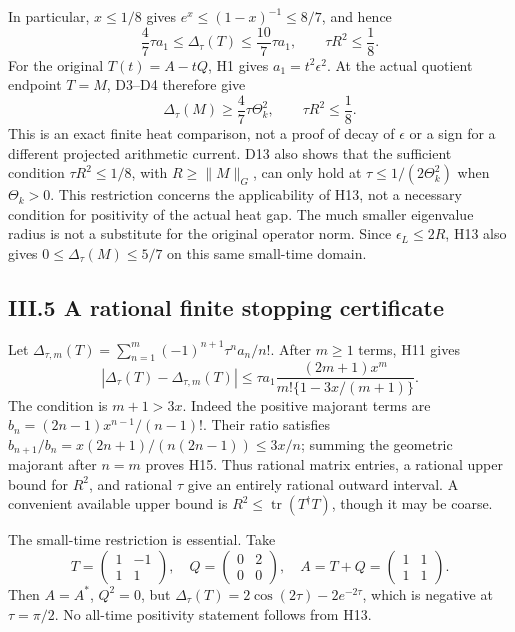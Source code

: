 In particular, \(x\le1/8\) gives \(e^x\le(1-x)^{-1}\le8/7\), and hence
\[
\boxed{
\frac47\tau a_1\le\Delta_\tau(T)
\le\frac{10}{7}\tau a_1,
\qquad \tau R^2\le\frac18.
}
\tag{H13}
\] For the original \(T(t)=A-tQ\), H1 gives \(a_1=t^2\epsilon^2\). At
the actual quotient endpoint \(T=M\), D3--D4 therefore give \[
\boxed{
\Delta_\tau(M)\ge\frac47\tau\Theta_k^2,
\qquad \tau R^2\le\frac18.
}
\tag{H14}
\] This is an exact finite heat comparison, not a proof of decay of
\(\epsilon\) or a sign for a different projected arithmetic current. D13
also shows that the sufficient condition \(\tau R^2\le1/8\), with
\(R\ge\|M\|_G\), can only hold at \(\tau\le1/(2\Theta_k^2)\) when
\(\Theta_k>0\). This restriction concerns the applicability of H13, not
a necessary condition for positivity of the actual heat gap. The much
smaller eigenvalue radius is not a substitute for the original operator
norm. Since \(\epsilon_L\le2R\), H13 also gives
\(0\le\Delta_\tau(M)\le5/7\) on this same small-time domain.

\subsection{III.5 A rational finite stopping
certificate}\label{iii.5-a-rational-finite-stopping-certificate}

Let \(\Delta_{\tau,m}(T)=\sum_{n=1}^m(-1)^{n+1}\tau^na_n/n!\). After
\(m\ge1\) terms, H11 gives \[
\boxed{\left|\Delta_\tau(T)-\Delta_{\tau,m}(T)\right|
\le\tau a_1\frac{(2m+1)x^m}{m!\{1-3x/(m+1)\}}.}
\tag{H15}
\] The condition is \(m+1>3x\). Indeed the positive majorant terms are
\(b_n=(2n-1)x^{n-1}/(n-1)!\). Their ratio satisfies
\(b_{n+1}/b_n=x(2n+1)/(n(2n-1))\le3x/n\); summing the geometric majorant
after \(n=m\) proves H15. Thus rational matrix entries, a rational upper
bound for \(R^2\), and rational \(\tau\) give an entirely rational
outward interval. A convenient available upper bound is
\(R^2\le\operatorname{tr}(T^\dagger T)\), though it may be coarse.

The small-time restriction is essential. Take \[
T=\begin{pmatrix}1&-1\\1&1\end{pmatrix},\quad
Q=\begin{pmatrix}0&2\\0&0\end{pmatrix},\quad
A=T+Q=\begin{pmatrix}1&1\\1&1\end{pmatrix}.
\] Then \(A=A^*\), \(Q^2=0\), but
\(\Delta_\tau(T)=2\cos(2\tau)-2e^{-2\tau}\), which is negative at
\(\tau=\pi/2\). No all-time positivity statement follows from H13.

